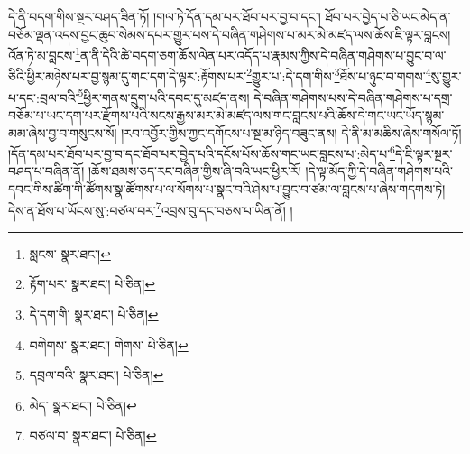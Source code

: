དེ་ནི་བདག་གིས་སྔར་བཤད་ཟིན་ཏོ། །གལ་ཏེ་དོན་དམ་པར་ཐོབ་པར་བྱ་བ་དང་། ཐོབ་པར་བྱེད་པ་ཅི་ཡང་མེད་ན་བཅོམ་ལྡན་འདས་བྱང་ཆུབ་སེམས་དཔར་གྱུར་པས་དེ་བཞིན་གཤེགས་པ་མར་མེ་མཛད་ལས་ཆོས་ཇི་ལྟར་བླངས། འོན་ཏེ་མ་བླངས་\footnote{སླངས་  སྣར་ཐང་། }ན་ནི་དེའི་ཚེ་བདག་ཅག་ཆོས་ལེན་པར་འདོད་པ་རྣམས་ཀྱིས་དེ་བཞིན་གཤེགས་པ་བྱུང་བ་ལ་ཅིའི་ཕྱིར་མཉེས་པར་བྱ་སྙམ་དུ་གང་དག་དེ་ལྟར་:རྟོགས་པར་\footnote{རྟོག་པར་  སྣར་ཐང་།  པེ་ཅིན། }གྱུར་པ་:དེ་དག་གིས་\footnote{དེ་དག་གི་  སྣར་ཐང་།  པེ་ཅིན། }ཐོས་པ་ཉུང་བ་གགས་\footnote{བགེགས་  སྣར་ཐང་། གེགས་  པེ་ཅིན། }སུ་གྱུར་པ་དང་:བྲལ་བའི་\footnote{དབྲལ་བའི་  སྣར་ཐང་།  པེ་ཅིན། }ཕྱིར་གནས་དྲུག་པའི་དབང་དུ་མཛད་ནས། དེ་བཞིན་གཤེགས་པས་དེ་བཞིན་གཤེགས་པ་དགྲ་བཅོམ་པ་ཡང་དག་པར་རྫོགས་པའི་སངས་རྒྱས་མར་མེ་མཛད་ལས་གང་བླངས་པའི་ཆོས་དེ་གང་ཡང་ཡོད་སྙམ་མམ་ཞེས་བྱ་བ་གསུངས་སོ། །རབ་འབྱོར་གྱིས་ཀྱང་དགོངས་པ་སྔ་མ་ཉིད་བཟུང་ནས། དེ་ནི་མ་མཆིས་ཞེས་གསོལ་ཏོ། །དོན་དམ་པར་ཐོབ་པར་བྱ་བ་དང་ཐོབ་པར་བྱེད་པའི་དངོས་པོས་ཆོས་གང་ཡང་བླངས་པ་:མེད་པ་\footnote{མེད་  སྣར་ཐང་།  པེ་ཅིན། }དེ་ཇི་ལྟར་སྔར་བཤད་པ་བཞིན་ནོ། །ཆོས་ཐམས་ཅད་རང་བཞིན་གྱིས་ཞི་བའི་ཡང་ཕྱིར་རོ། །དེ་ལྟ་མོད་ཀྱི་དེ་བཞིན་གཤེགས་པའི་དབང་གིས་ཚིག་གི་ཚོགས་སྣ་ཚོགས་པ་ལ་སོགས་པ་སྣང་བའི་ཤེས་པ་བྱུང་བ་ཙམ་ལ་བླངས་པ་ཞེས་གདགས་ཏེ། དེས་ན་ཐོས་པ་ཡོངས་སུ་:བཙལ་བར་\footnote{བཙལ་བ་  སྣར་ཐང་།  པེ་ཅིན། }འབྲས་བུ་དང་བཅས་པ་ཡིན་ནོ། །
